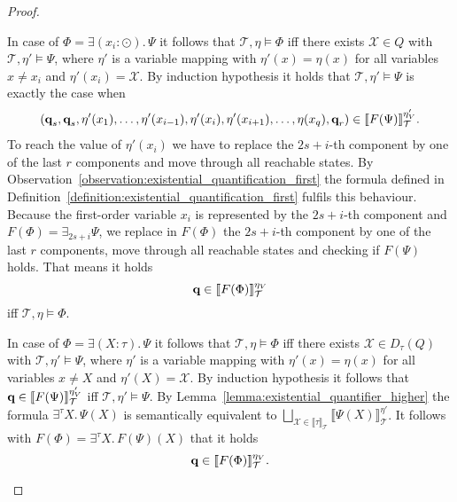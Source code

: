 \begin{proof}
\begin{compactitem}
        \item In case of $\Phi = \exists (x_i\colon \odot).\,\Psi$ it follows that $\mathcal{T}, \eta \models \Phi$ iff
        there exists  $\mathcal{X} \in Q$ with $\mathcal{T}, \eta' \models \Psi$, where $\eta'$ is a variable mapping with $\eta'(x) = \eta(x)$ for all variables $x \neq x_i$ and $\eta'(x_i) = \mathcal{X}$. By induction hypothesis it holds that $\mathcal{T}, \eta' \models \Psi$ is exactly the case when
        \begin{align*}
            (\emph{q}_s, \emph{q}_s, \eta'(x_1), \dots, \eta'(x_{i-1}), \eta'(x_i), \eta'(x_{i+1}), \dots, \eta(x_{q}), \emph{q}_r) \in
            \llbracket F(\Psi) \rrbracket^{{\eta'_V}}_\mathcal{T}.
        \end{align*}
        To reach the value of $\eta'(x_i)$ we have to replace the $2s+i$-th component by one of 
        the last $r$ components and move through all reachable states. By Observation~\ref{observation:existential_quantification_first} the formula defined in Definition~\ref{definition:existential_quantification_first} fulfils this behaviour. Because the first-order variable $x_i$ is represented by the $2s+i$-th component and $F(\Phi) = \exists_{2s+i} \Psi$, we replace in $F(\Phi)$ the $2s+i$-th component by one of the last $r$ components, move through all reachable states and checking if $F(\Psi)$ holds. That means it holds 
        \[\emph{q} \in \llbracket F
        (\Phi) \rrbracket^{\eta_V}_\mathcal{T}\]
        iff $\mathcal{T}, \eta \models \Phi$.

        \item In case of $\Phi = \exists (X \colon \tau).\,\Psi$ it follows that $\mathcal{T}, \eta \models \Phi$ iff
        there exists $\mathcal{X} \in D_\tau(Q)$ with $\mathcal{T}, \eta' \models \Psi$, where $\eta'$ is a variable mapping with $\eta'(x) = \eta(x)$ for all variables $x \neq X$ and $\eta'(X) = \mathcal{X}$.
        By induction hypothesis it follows that $\emph{q} \in
        \llbracket F(\Psi) \rrbracket^{{\eta'_V}}_\mathcal{T}$ iff $\mathcal{T}, \eta' \models \Psi$. By Lemma~\ref{lemma:existential_quantifier_higher} the formula $\exists^\tau X.\, \Psi(X)$ is semantically equivalent to
        $\underset{\mathcal{X} \in \llbracket \tau \rrbracket_\mathcal{T}}{\bigsqcup} \llbracket \Psi(X) \rrbracket^{\eta'}_\mathcal{T}$.
        It follows with $F(\Phi) = \exists^\tau X.\, F(\Psi)(X)$ that it holds \[\emph{q} \in
        \llbracket F(\Phi) \rrbracket^{\eta_V}_\mathcal{T}.\]


\end{compactitem}
\end{proof}
